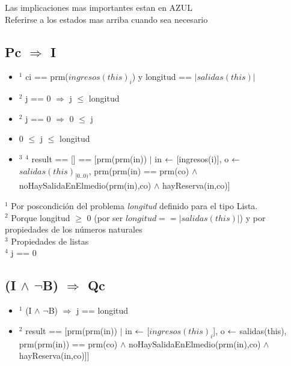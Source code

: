 \small Las implicaciones mas importantes estan en \textcolor{NavyBlue}{AZUL}\\
\small Referirse a los estados mas arriba cuando sea necesario\\
\vspace{2mm}

\subsection{Pc $ \Rightarrow $ I}
\begin{itemize}
	\item $ ^1 $ \textcolor{NavyBlue}{ci == prm($ingresos(this)_i$) y longitud == $|salidas(this)|$} \checkmark
	\item $ ^2 $ j == 0 $ \Rightarrow $ j $ \leq $ longitud
	\item $ ^2 $ j == 0  $ \Rightarrow $ 0 $ \leq $ j
	\item \textcolor{NavyBlue}{0 $ \leq $ j $ \leq $ longitud} \checkmark
	\item $ ^3 $ $ ^4 $ \textcolor{NavyBlue}{result == [] == [prm(prm(in)) $|$ in $ \leftarrow $ [ingresos(i)], o $ \leftarrow $ $salidas(this)_{[0..0)}$, prm(prm(in) == prm(co) $\land$ noHaySalidaEnElmedio(prm(in),co) $\land$ hayReserva(in,co)]} \checkmark
\end{itemize}
\vspace{3mm}

\noindent $ ^1 $ Por poscondición del problema \emph{longitud} definido para el tipo Lista.\\
$ ^2 $ Porque longitud $\geq$ 0 (por ser $longitud == |salidas(this)|$) y por propiedades de los números naturales\\
$ ^3 $ Propiedades de listas\\
$ ^4 $ j == 0 \\

\subsection{(I $ \land $ $ \lnot $B) $ \Rightarrow $ Qc}

\begin{itemize}
	\item $ ^1 $ (I $ \land $ $ \lnot $B) $ \Rightarrow $ j == longitud
	\item $ ^2 $ \textcolor{NavyBlue}{ result == [prm(prm(in)) $|$ in $\leftarrow$ [$ingresos(this)_i$], o $\leftarrow$ salidas(this), prm(prm(in)) == prm(co) $\land$ noHaySalidaEnElmedio(prm(in),co) $\land$ hayReserva(in,co)]]} \checkmark
\end{itemize}

